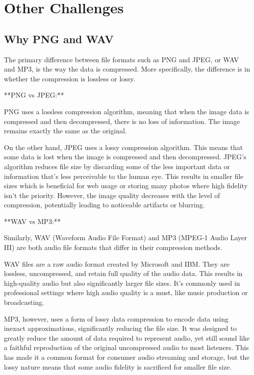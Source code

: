 \documentclass{article}
\begin{document}
\section{Other Challenges}
\subsection{Why PNG and WAV}
The primary difference between file formats such as PNG and JPEG, or WAV and MP3, is the way the data is compressed. More specifically, the difference is in whether the compression is lossless or lossy.

**PNG vs JPEG:**

PNG uses a lossless compression algorithm, meaning that when the image data is compressed and then decompressed, there is no loss of information. The image remains exactly the same as the original.

On the other hand, JPEG uses a lossy compression algorithm. This means that some data is lost when the image is compressed and then decompressed. JPEG's algorithm reduces file size by discarding some of the less important data or information that's less perceivable to the human eye. This results in smaller file sizes which is beneficial for web usage or storing many photos where high fidelity isn't the priority. However, the image quality decreases with the level of compression, potentially leading to noticeable artifacts or blurring.

**WAV vs MP3:**

Similarly, WAV (Waveform Audio File Format) and MP3 (MPEG-1 Audio Layer III) are both audio file formats that differ in their compression methods.

WAV files are a raw audio format created by Microsoft and IBM. They are lossless, uncompressed, and retain full quality of the audio data. This results in high-quality audio but also significantly larger file sizes. It's commonly used in professional settings where high audio quality is a must, like music production or broadcasting.

MP3, however, uses a form of lossy data compression to encode data using inexact approximations, significantly reducing the file size. It was designed to greatly reduce the amount of data required to represent audio, yet still sound like a faithful reproduction of the original uncompressed audio to most listeners. This has made it a common format for consumer audio streaming and storage, but the lossy nature means that some audio fidelity is sacrificed for smaller file size.
\end{document}
